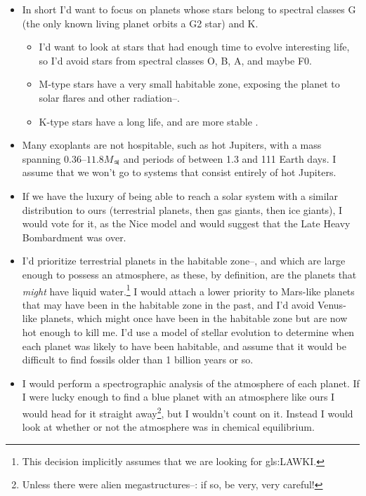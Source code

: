\documentclass[]{article}
\begin{document}
\begin{itemize}
	\item In short I'd want to focus on planets whose stars belong to spectral classes G (the only known living planet orbits a G2 star) and K.
	\begin{itemize}
		\item I'd want to look at stars that had enough time to evolve interesting life, so I'd avoid stars from spectral classes O, B, A, and maybe F0\cite{antf2019spectral}.
		\item M-type stars have a very small habitable zone, exposing the planet to solar flares and other radiation--\cite{dvorskywim2015this}.
		\item K-type stars have a long life, and are more stable \cite{shiga2009orange} \cite{wiki:kTypeStar}.
	\end{itemize} 
	\item Many exoplants are not hospitable, such as hot Jupiters\cite{ wiki:hot:jupiter}, with a mass spanning $0.36\text{--}11.8M_{\jupiter}$ and periods of between 1.3 and 111 Earth days. I assume that we won't go to systems that consist entirely of hot Jupiters.
	\item If we have the luxury of being able to reach a solar system with a similar distribution to ours (terrestrial planets, then gas giants, then ice giants), I would vote for it, as the Nice model \cite{morbidelli2010coherent} and \cite{gomes2005origin} would suggest that the Late Heavy Bombardment was over.
	\item I'd prioritize terrestrial planets in the habitable zone--\cite{nasa2019goldilocks}, and which are large enough to possess an atmosphere, as these, by definition, are the planets that \textit{might} have liquid water.\footnote{This decision implicitly assumes that we are looking for \gls{gls:LAWKI}. } I would attach a lower priority to Mars-like planets that may have been in the habitable zone in the past, and I'd avoid Venus-like planets, which might once have been in the habitable zone but are now hot enough to kill me. I'd use a model of stellar evolution\cite{wiki:stellar:evolution} to determine when each planet was likely to have been habitable, and assume that it would be difficult to find fossils older than 1 billion years or so.
	\item I would perform a spectrographic analysis of the atmosphere of each planet. If I were lucky enough to find a blue planet with an atmosphere like ours I would head for it straight away\footnote{Unless there were alien megastructures--\cite{wiki:ringworld}: if so, be very, very careful!}, but I wouldn't count on it. Instead I would look at whether or not the atmosphere was in chemical equilibrium\cite{lovelock1974atmospheric}.

\end{itemize}
\end{document}
